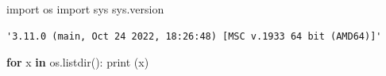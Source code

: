 \documentclass[
  letterpaper,
  DIV=11,
  numbers=noendperiod]{scrreprt}
\newenvironment{Shaded}{\begin{snugshade}}{\end{snugshade}}
\newcommand{\BuiltInTok}[1]{\textcolor[rgb]{0.00,0.23,0.31}{#1}}
\newcommand{\ControlFlowTok}[1]{\textcolor[rgb]{0.00,0.23,0.31}{\textbf{#1}}}
\newcommand{\ImportTok}[1]{\textcolor[rgb]{0.00,0.46,0.62}{#1}}
\newcommand{\KeywordTok}[1]{\textcolor[rgb]{0.00,0.23,0.31}{\textbf{#1}}}
\newcommand{\NormalTok}[1]{\textcolor[rgb]{0.00,0.23,0.31}{#1}}
\begin{document}
\begin{Shaded}
\begin{Highlighting}[]
\ImportTok{import}\NormalTok{ os}
\ImportTok{import}\NormalTok{ sys}
\NormalTok{sys.version}
\end{Highlighting}
\end{Shaded}

\begin{verbatim}
'3.11.0 (main, Oct 24 2022, 18:26:48) [MSC v.1933 64 bit (AMD64)]'
\end{verbatim}

\begin{Shaded}
\begin{Highlighting}[]
\ControlFlowTok{for}\NormalTok{ x }\KeywordTok{in}\NormalTok{ os.listdir():}
  \BuiltInTok{print}\NormalTok{ (x)}
\end{Highlighting}
\end{Shaded}
\end{document}
